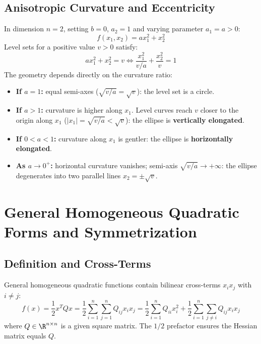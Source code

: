 \subsection{Anisotropic Curvature and Eccentricity}
In dimension $n = 2$, setting $b = 0$, $a_2 = 1$ and varying parameter $a_1 = a > 0$:
\begin{equation}
f(x_1, x_2) = a x_1^2 + x_2^2
\end{equation}
Level sets for a positive value $v > 0$ satisfy:
\begin{equation}
a x_1^2 + x_2^2 = v \iff \frac{x_1^2}{v/a} + \frac{x_2^2}{v} = 1
\end{equation}
The geometry depends directly on the curvature ratio:
\begin{itemize}
    \item \textbf{If $a = 1$:} equal semi-axes ($\sqrt{v/a} = \sqrt{v}$): the level set is a circle.
    \item \textbf{If $a > 1$:} curvature is higher along $x_1$. Level curves reach $v$ closer to the origin along $x_1$ ($|x_1| = \sqrt{v/a} < \sqrt{v}$): the ellipse is \textbf{vertically elongated}.
    \item \textbf{If $0 < a < 1$:} curvature along $x_1$ is gentler: the ellipse is \textbf{horizontally elongated}.
    \item \textbf{As $a \to 0^+$:} horizontal curvature vanishes; semi-axis $\sqrt{v/a} \to +\infty$: the ellipse degenerates into two parallel lines $x_2 = \pm \sqrt{v}$.
\end{itemize}


\FloatBarrier
\section{General Homogeneous Quadratic Forms and Symmetrization}
\label{sec:opt-general-quadratic-symmetrization-en}

\subsection{Definition and Cross-Terms}
General homogeneous quadratic functions contain bilinear cross-terms $x_i x_j$ with $i \neq j$:
\begin{equation}
f(x) = \frac{1}{2} x^T Q x = \frac{1}{2} \sum_{i=1}^n \sum_{j=1}^n Q_{ij} x_i x_j = \frac{1}{2} \sum_{i=1}^n Q_{ii} x_i^2 + \frac{1}{2} \sum_{i=1}^n \sum_{j \neq i} Q_{ij} x_i x_j
\end{equation}
where $Q \in \R^{n \times n}$ is a given square matrix. The $1/2$ prefactor ensures the Hessian matrix equals $Q$.

